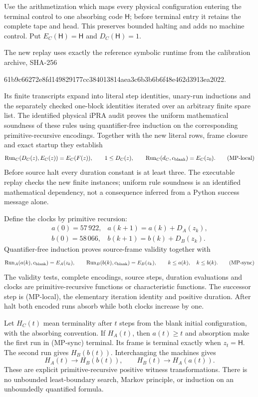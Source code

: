 Use the arithmetization which maps every physical configuration entering
the terminal control to one absorbing code $\mathsf H$; before terminal
entry it retains the complete tape and head. This preserves bounded
halting and adds no machine control. Put $E_C(\mathsf H)=\mathsf H$ and
$D_C(\mathsf H)=1$.

The new replay uses exactly the reference symbolic runtime from the
calibration archive, SHA-256
\begin{center}\small\ttfamily
61b9c66272e8fd149829177cc384013814aea3c6b3b6b6f48e462d3913ea2022.
\end{center}
Its finite transcripts expand into literal step identities, unary-run
inductions and the separately checked one-block identities iterated over
an arbitrary finite spare list. The identified physical iPRA audit proves
the uniform mathematical soundness of these rules using quantifier-free
induction on the corresponding primitive-recursive encodings. Together
with the new literal rows, frame closure and exact startup they establish
\[
 \operatorname{Run}_C(D_C(z),E_C(z))=E_C(F(z)),\qquad
 1\le D_C(z),\qquad
 \operatorname{Run}_C(d_C,c_{\rm blank})=E_C(z_0).
 \tag{MP-local}
\]
Before source halt every duration constant is at least three. The
executable replay checks the new finite instances; uniform rule soundness
is an identified mathematical dependency, not a consequence inferred from
a Python success message alone.

Define the clocks by primitive recursion:
\[
 \begin{array}{lll}
 a(0)=57\,922,&a(k+1)=a(k)+D_A(z_k),\\
 b(0)=58\,066,&b(k+1)=b(k)+D_B(z_k).
 \end{array}
\]
Quantifier-free induction proves source-frame validity together with
\[
 \operatorname{Run}_A(a(k),c_{\rm blank})=E_A(z_k),\qquad
 \operatorname{Run}_B(b(k),c_{\rm blank})=E_B(z_k),\qquad
 k\le a(k),\quad k\le b(k).
 \tag{MP-sync}
\]
The validity tests, complete encodings, source steps, duration evaluations
and clocks are primitive-recursive functions or characteristic functions.
The successor step is (MP-local), the elementary iteration identity and
positive duration. After halt both encoded runs absorb while both clocks
increase by one.

Let $H_C(t)$ mean terminality after $t$ steps from the blank initial
configuration, with the absorbing convention. If $H_A(t)$, then
$a(t)\ge t$ and absorption make the first run in (MP-sync) terminal.
Its frame is terminal exactly when $z_t=\mathsf H$. The second run gives
$H_B(b(t))$. Interchanging the machines gives
\[
 \boxed{H_A(t)\longrightarrow H_B(b(t)),\qquad
 H_B(t)\longrightarrow H_A(a(t)).}
 \tag{MP-transfer}
\]
These are explicit primitive-recursive positive witness transformations.
There is no unbounded least-boundary search, Markov principle, or induction
on an unboundedly quantified formula.

